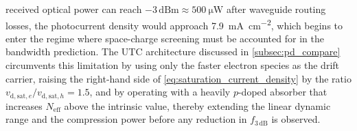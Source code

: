 received optical power can reach $-3\,\mathrm{dBm} \approx \SI{500}{\micro\watt}$
after waveguide routing losses, the photocurrent density would approach
\SI{7.9}{\milli\ampere\per\centi\metre\squared}, which begins to enter the
regime where space-charge screening must be accounted for in the bandwidth
prediction. The UTC architecture discussed in \cref{subsec:pd_compare}
circumvents this limitation by using only the faster electron species as the
drift carrier, raising the right-hand side of \cref{eq:saturation_current_density}
by the ratio $v_{\mathrm{d,sat},e}/v_{\mathrm{d,sat},h} = 1.5$, and by
operating with a heavily $p$-doped absorber that increases $N_{\mathrm{eff}}$
above the intrinsic value, thereby extending the linear dynamic range and the
compression power before any reduction in $f_{3\,\mathrm{dB}}$ is observed.



